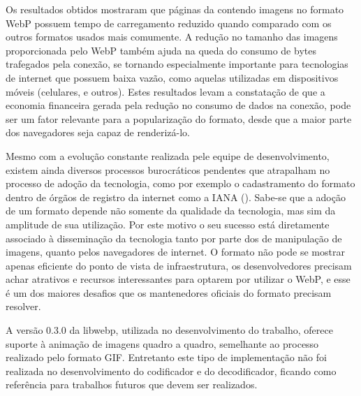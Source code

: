 \documentclass[espaco=simples,appendix=Name]{abnt}
\begin{document}
Os resultados obtidos mostraram que páginas da  contendo imagens no formato WebP possuem tempo de carregamento reduzido quando comparado com os outros formatos usados mais comumente. A redução no tamanho das imagens proporcionada pelo WebP também ajuda na queda do consumo de bytes trafegados pela conexão, se tornando especialmente importante para tecnologias de internet que possuem baixa vazão, como aquelas utilizadas em dispositivos móveis (celulares,  e outros). Estes resultados levam a constatação de que a economia financeira gerada pela redução no consumo de dados na conexão, pode ser um fator relevante para a popularização do formato, desde que a maior parte dos navegadores seja capaz de renderizá-lo.

Mesmo com a evolução constante realizada pele equipe de desenvolvimento, existem ainda diversos processos burocráticos pendentes que atrapalham no processo de adoção da tecnologia, como por exemplo o cadastramento do formato dentro de órgãos de registro da internet como a IANA (). Sabe-se que a adoção de um formato depende não somente da qualidade da tecnologia, mas sim da amplitude de sua utilização. Por este motivo o seu sucesso está diretamente associado à disseminação da tecnologia tanto por parte dos  de manipulação de imagens, quanto pelos navegadores de internet. O formato não pode se mostrar apenas eficiente do ponto de vista de infraestrutura, os desenvolvedores precisam achar atrativos e recursos interessantes para optarem por utilizar o WebP, e esse é um dos maiores desafios que os mantenedores oficiais do formato precisam resolver.

A versão 0.3.0 da libwebp, utilizada no desenvolvimento do trabalho, oferece suporte à animação de imagens quadro a quadro, semelhante ao processo realizado pelo formato GIF. Entretanto este tipo de implementação não foi realizada no desenvolvimento do codificador e do decodificador, ficando como referência para trabalhos futuros que devem ser realizados.


\end{document}
